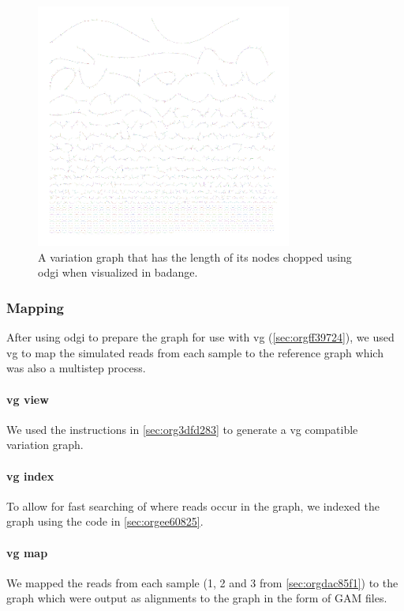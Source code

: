 \documentclass[10pt, a4paper]{article}
\begin{document}
\begin{figure}[h]
\centering
\includegraphics[width=0.75\textwidth]{../Figures/SARS_CoV_2/SARS_Variation_Graph.png}
\caption[SARS-CoV-2 Variation Graph]{\label{fig:orgc2b6c53}
A variation graph that has the length of its nodes chopped using odgi when visualized in badange.}
\end{figure}

\subsubsection{Mapping}
\label{sec:org904e691}
After using odgi to prepare the graph for use with vg
(\ref{sec:orgff39724}), we used vg to map the simulated reads from
each sample to the reference graph which was also a multistep process.

\paragraph{vg view}
\label{sec:orgca31f4d}
We used the instructions in \ref{sec:org3dfd283} to generate a vg
\cite{garrisonVariationGraphToolkit2018} compatible variation graph. 

\paragraph{vg index}
\label{sec:org4943832}
To allow for fast searching of where reads occur in the graph, we indexed the 
graph using the code in \ref{sec:orgee60825}.

\paragraph{vg map}
\label{sec:org18fcf4d}
We mapped the reads from each sample (1, 2 and 3 from \ref{sec:orgdac85f1}) to the 
graph which were output as alignments to the graph in the form of GAM files. 
\end{document}
